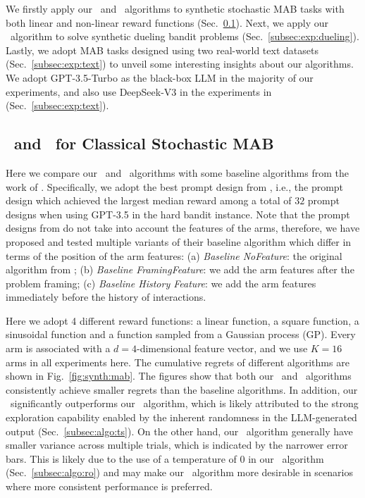 We firstly apply our \algts~and \algro~algorithms to synthetic stochastic MAB tasks with both linear and non-linear reward functions (Sec.~\ref{subsec:exp:classical}).
Next, we apply our \algtsduel~algorithm to solve synthetic dueling bandit problems (Sec.~\ref{subsec:exp:dueling}).
Lastly, we adopt MAB tasks designed using two real-world text datasets (Sec.~\ref{subsec:exp:text}) to unveil some interesting insights about our algorithms.
We adopt GPT-3.5-Turbo \cite{citechatgpt} as the black-box LLM in the majority of our experiments, and also use DeepSeek-V3 \cite{liu2024deepseek} in the experiments in (Sec.~\ref{subsec:exp:text}).

\subsection{\algts~and \algro~for Classical Stochastic MAB}
\label{subsec:exp:classical}
Here we compare our \algts~and \algro~algorithms with some baseline algorithms from the work of \citet{krishnamurthy2024can}.
Specifically, we adopt the best prompt design from \citet{krishnamurthy2024can}, i.e., the prompt design which achieved the largest median reward among a total of $32$ prompt designs when using GPT-3.5 in the hard bandit instance. 
Note that the prompt designs from \citet{krishnamurthy2024can} do not take into account the features of the arms, therefore, we have proposed and tested multiple variants of their baseline algorithm which differ in terms of the position of the arm features:
(a) \emph{Baseline NoFeature}: the original algorithm from \citet{krishnamurthy2024can}; (b) \emph{Baseline FramingFeature}: we add the arm features after the problem framing; (c) \emph{Baseline History Feature}: we add the arm features immediately before the history of interactions.

Here we adopt 4 different reward functions: a linear function, a square function, a sinusoidal function and a function sampled from a Gaussian process (GP).
Every arm is associated with a $d=4$-dimensional feature vector, and we use $K=16$ arms in all experiments here.
The cumulative regrets of different algorithms are shown in Fig.~\ref{fig:synth:mab}.
The figures show that both our \algts~and \algro~algorithms consistently achieve smaller regrets than the baseline algorithms.
In addition, our \algts~significantly outperforms our \algro~algorithm, which is likely attributed to the strong exploration capability enabled by the inherent randomness in the LLM-generated output (Sec.~\ref{subsec:algo:ts}).
On the other hand, our \algro~algorithm generally have smaller variance across multiple trials, which is indicated by the narrower error bars.
This is likely due to the use of a temperature of $0$ in our \algro~algorithm (Sec.~\ref{subsec:algo:ro}) and may make our \algro~algorithm more desirable in scenarios where more consistent performance is preferred.


